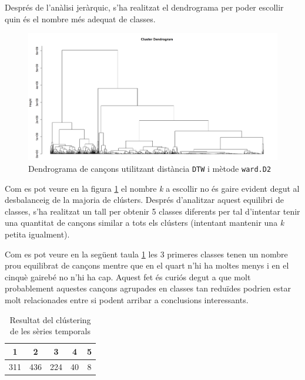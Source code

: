 \documentclass{article}
\begin{document}
Després de l'anàlisi jeràrquic, s'ha realitzat el dendrograma per poder escollir quin és el nombre més adequat de classes.

\begin{figure}[H]
    \centering
    \includegraphics[width=\textwidth]{Images/4_clustering/time_series/dendrograma_original.png}
    \caption{Dendrograma de cançons utilitzant distància \texttt{DTW} i mètode \texttt{ward.D2}}
    \label{fig:TS_dendrograma_original}
\end{figure}

Com es pot veure en la figura \ref{fig:TS_dendrograma_original} el nombre \textit{k} a escollir no és gaire evident degut al desbalanceig de la majoria de clústers. Després d'analitzar aquest equilibri de classes, s'ha realitzat un tall per obtenir 5 classes diferents per tal d'intentar tenir una quantitat de cançons similar a tots els clústers (intentant mantenir una \textit{k} petita igualment).

Com es pot veure en la següent taula \ref{tab:clustering_results} les 3 primeres classes tenen un nombre prou equilibrat de cançons mentre que en el quart n'hi ha moltes menys i en el cinquè gairebé no n'hi ha cap. Aquest fet és curiós degut a que molt probablement aquestes cançons agrupades en classes tan reduïdes podrien estar molt relacionades entre si podent arribar a conclusions interessants.

\begin{table}[H]
\centering
\begin{tabular}{|c|c|c|c|c|}
\hline
1    & 2    & 3   & 4   & 5 \\ \hline
311 & 436 & 224 & 40 & 8  \\ \hline
\end{tabular}
\caption{Resultat del clústering de les sèries temporals}
\label{tab:clustering_results}
\end{table}
\end{document}
